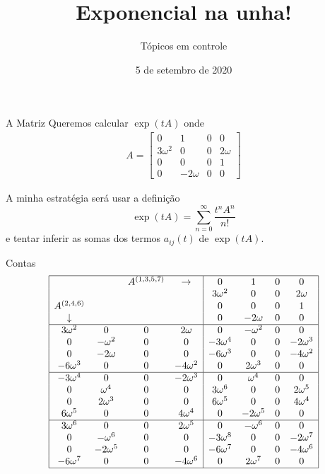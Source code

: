 \documentclass{beamer}
\title[]{Exponencial na unha!}
\author{Tópicos em controle}
\institute{IME USP}
\date{5 de setembro de 2020}
\begin{document}
\begin{frame}
  \titlepage
\end{frame}

\begin{frame}{A Matriz}
  Queremos calcular $\exp(tA)$ onde 
  \begin{gather*}
    A= \begin{bmatrix}
      0 & 1 & 0 & 0 \\
      3\omega^2 & 0 & 0 &2\omega \\
      0 & 0 & 0 & 1 \\
      0 & -2\omega & 0 & 0
    \end{bmatrix}
  \end{gather*}

  A minha estratégia será usar a definição 
  $$ \exp(tA) = \sum_{n=0}^\infty \frac{t^n A^n}{n!}$$
  e tentar inferir as somas dos termos $a_{ij}(t)$ de $\exp(tA)$.

 
  
\end{frame}
\begin{frame}{Contas}
  \begin{gather*}
    \begin{array}{|cccc|cccc|} \hline
      & & A^{(1,3,5,7)}& \rightarrow&0 & 1 & 0 & 0 \\
     & & & & 3\omega^2 & 0 & 0 &2\omega \\
     A^{(2,4,6)}& & & &0 & 0 & 0 & 1 \\
     \downarrow& & & &0 & -2\omega & 0 & 0 \\ \hline
     3\omega^2 & 0 & 0 &2\omega &0 & -\omega^2&0 &0 \\
     0 & -\omega^2 & 0 & 0 &-3\omega^4 &0 &0 &-2\omega^3 \\
     0 & -2\omega & 0 & 0 & -6\omega^3&0 &0 &-4\omega^2 \\
     -6\omega^3 & 0 & 0 &-4\omega^2 &0 &2\omega^3 & 0 & 0 \\ \hline
     -3\omega^4 & 0 & 0 &-2\omega^3 &0 & \omega^4&0 &0 \\
     0 & \omega^4 & 0 & 0 &3\omega^6 &0 &0 &2\omega^5 \\
     0 & 2\omega^3 & 0 & 0 & 6\omega^5&0 &0 &4\omega^4 \\
     6\omega^5 & 0 & 0 &4\omega^4 &0 &-2\omega^5 & 0 & 0 \\ \hline
     3\omega^6 & 0 & 0 &2\omega^5 &0 & -\omega^6&0 &0 \\
     0 & -\omega^6 & 0 & 0 &-3\omega^8 &0 &0 &-2\omega^7 \\
     0 & -2\omega^5 & 0 & 0 & -6\omega^7&0 &0 &-4\omega^6 \\
     -6\omega^7 & 0 & 0 &-4\omega^6 &0 &2\omega^7 & 0 & 0 \\ \hline
    \end{array}
  \end{gather*}

\end{frame}
\end{document}

